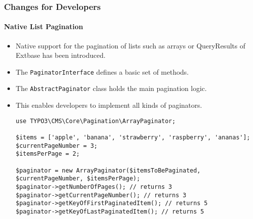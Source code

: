 
\begin{frame}[fragile]
	\frametitle{Changes for Developers}
	\framesubtitle{Native List Pagination}

	\lstset{basicstyle=\tiny\ttfamily}

	\begin{itemize}
		\item Native support for the pagination of lists such as arrays or QueryResults of Extbase has been introduced.
		\item The \texttt{PaginatorInterface} defines a basic set of methods.
		\item The \texttt{AbstractPaginator} class holds the main pagination logic.
		\item This enables developers to implement all kinds of paginators.
\begin{lstlisting}
use TYPO3\CMS\Core\Pagination\ArrayPaginator;

$items = ['apple', 'banana', 'strawberry', 'raspberry', 'ananas'];
$currentPageNumber = 3;
$itemsPerPage = 2;

$paginator = new ArrayPaginator($itemsToBePaginated, $currentPageNumber, $itemsPerPage);
$paginator->getNumberOfPages(); // returns 3
$paginator->getCurrentPageNumber(); // returns 3
$paginator->getKeyOfFirstPaginatedItem(); // returns 5
$paginator->getKeyOfLastPaginatedItem(); // returns 5
\end{lstlisting}

	\end{itemize}

\end{frame}


